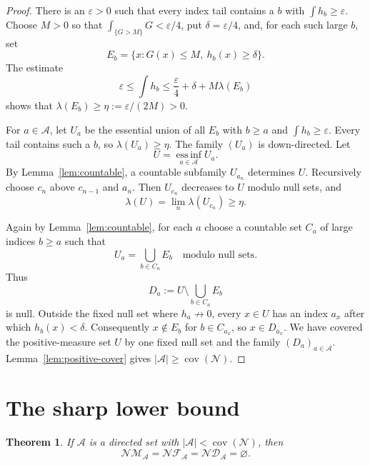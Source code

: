 \documentclass[11pt]{article}
\newtheorem{theorem}{Theorem}
\theoremstyle{remark}
\newcommand{\covN}{\operatorname{cov}(\mathcal N)}
\newcommand{\cNM}{\mathcal{NM}}
\newcommand{\cNF}{\mathcal{NF}}
\newcommand{\cND}{\mathcal{ND}}
\newcommand{\essinf}{\operatorname*{ess\,inf}}
\begin{document}
\begin{proof}
There is an \(\varepsilon>0\) such that every index tail contains a
\(b\) with \(\int h_b\ge\varepsilon\).  Choose \(M>0\) so that
\(\int_{\{G>M\}}G<\varepsilon/4\), put
\(\delta=\varepsilon/4\), and, for each such large \(b\), set
\[
 E_b=\{x:G(x)\le M,\ h_b(x)\ge\delta\}.
\]
The estimate
\[
 \varepsilon\le\int h_b
 \le \frac{\varepsilon}{4}+\delta+M\lambda(E_b)
\]
shows that \(\lambda(E_b)\ge\eta:=\varepsilon/(2M)>0\).

For \(a\in\mathcal A\), let \(U_a\) be the essential union of all \(E_b\)
with \(b\ge a\) and \(\int h_b\ge\varepsilon\).  Every tail contains such a
\(b\), so \(\lambda(U_a)\ge\eta\).  The family \((U_a)\) is
down-directed.  Let
\[
       U=\essinf_{a\in\mathcal A}U_a.
\]
By Lemma~\ref{lem:countable}, a countable subfamily \(U_{a_n}\) determines
\(U\).  Recursively choose \(c_n\) above \(c_{n-1}\) and \(a_n\).
Then \(U_{c_n}\) decreases to \(U\) modulo null sets, and
\[
       \lambda(U)=\lim_n\lambda(U_{c_n})\ge\eta.
\]

Again by Lemma~\ref{lem:countable}, for each \(a\) choose a countable set
\(C_a\) of large indices \(b\ge a\) such that
\[
       U_a=\bigcup_{b\in C_a}E_b\quad\text{modulo null sets}.
\]
Thus
\[
       D_a:=U\setminus\bigcup_{b\in C_a}E_b
\]
is null.  Outside the fixed null set where \(h_a\not\to0\), every
\(x\in U\) has an index \(a_x\) after which \(h_b(x)<\delta\).
Consequently \(x\notin E_b\) for \(b\in C_{a_x}\), so \(x\in D_{a_x}\).
We have covered the positive-measure set \(U\) by one fixed null set and
the family \((D_a)_{a\in\mathcal A}\).  Lemma~\ref{lem:positive-cover}
gives \(|\mathcal A|\ge\covN\).
\end{proof}

\section{The sharp lower bound}

\begin{theorem}
\label{thm:empty}
If \(\mathcal A\) is a directed set with
\(|\mathcal A|<\covN\), then
\[
       \cNM_{\mathcal A}
       =\cNF_{\mathcal A}
       =\cND_{\mathcal A}
       =\varnothing.
\]
\end{theorem}
\end{document}
